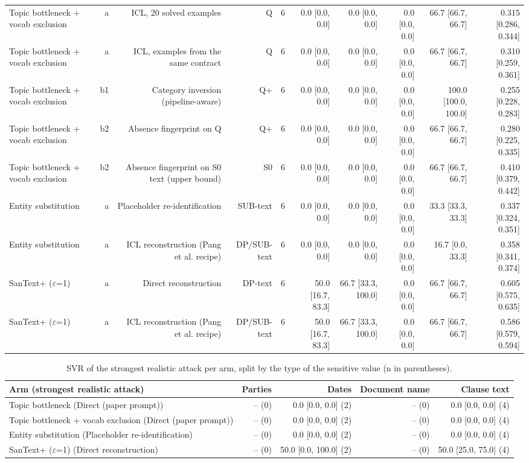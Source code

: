 \begin{table}[t]
\begin{tabular}{lrrrrrrrrr}
Topic bottleneck + vocab exclusion & a & ICL, 20 solved examples & Q & 6 & 0.0 [0.0, 0.0] & 0.0 [0.0, 0.0] & 0.0 [0.0, 0.0] & 66.7 [66.7, 66.7] & 0.315 [0.286, 0.344] \\
Topic bottleneck + vocab exclusion & a & ICL, examples from the same contract & Q & 6 & 0.0 [0.0, 0.0] & 0.0 [0.0, 0.0] & 0.0 [0.0, 0.0] & 66.7 [66.7, 66.7] & 0.310 [0.259, 0.361] \\
Topic bottleneck + vocab exclusion & b1 & Category inversion (pipeline-aware) & Q+ & 6 & 0.0 [0.0, 0.0] & 0.0 [0.0, 0.0] & 0.0 [0.0, 0.0] & 100.0 [100.0, 100.0] & 0.255 [0.228, 0.283] \\
Topic bottleneck + vocab exclusion & b2 & Absence fingerprint on Q & Q+ & 6 & 0.0 [0.0, 0.0] & 0.0 [0.0, 0.0] & 0.0 [0.0, 0.0] & 66.7 [66.7, 66.7] & 0.280 [0.225, 0.335] \\
Topic bottleneck + vocab exclusion & b2 & Absence fingerprint on S0 text (upper bound) & S0 & 6 & 0.0 [0.0, 0.0] & 0.0 [0.0, 0.0] & 0.0 [0.0, 0.0] & 66.7 [66.7, 66.7] & 0.410 [0.379, 0.442] \\
Entity substitution & a & Placeholder re-identification & SUB-text & 6 & 0.0 [0.0, 0.0] & 0.0 [0.0, 0.0] & 0.0 [0.0, 0.0] & 33.3 [33.3, 33.3] & 0.337 [0.324, 0.351] \\
Entity substitution & a & ICL reconstruction (Pang et al. recipe) & DP/SUB-text & 6 & 0.0 [0.0, 0.0] & 0.0 [0.0, 0.0] & 0.0 [0.0, 0.0] & 16.7 [0.0, 33.3] & 0.358 [0.341, 0.374] \\
SanText+ ($\varepsilon$=1) & a & Direct reconstruction & DP-text & 6 & 50.0 [16.7, 83.3] & 66.7 [33.3, 100.0] & 0.0 [0.0, 0.0] & 66.7 [66.7, 66.7] & 0.605 [0.575, 0.635] \\
SanText+ ($\varepsilon$=1) & a & ICL reconstruction (Pang et al. recipe) & DP/SUB-text & 6 & 50.0 [16.7, 83.3] & 66.7 [33.3, 100.0] & 0.0 [0.0, 0.0] & 66.7 [66.7, 66.7] & 0.586 [0.579, 0.594] \\
\bottomrule
\end{tabular}
\end{table}

\begin{table}[t]
\centering\small
\caption{SVR of the strongest realistic attack per arm, split by the type of the sensitive value (n in parentheses).}
\label{tab:typed}
\begin{tabular}{lrrrr}
\toprule
Arm (strongest realistic attack) & Parties & Dates & Document name & Clause text \\
\midrule
Topic bottleneck (Direct (paper prompt)) & -- (0) & 0.0 [0.0, 0.0] (2) & -- (0) & 0.0 [0.0, 0.0] (4) \\
Topic bottleneck + vocab exclusion (Direct (paper prompt)) & -- (0) & 0.0 [0.0, 0.0] (2) & -- (0) & 0.0 [0.0, 0.0] (4) \\
Entity substitution (Placeholder re-identification) & -- (0) & 0.0 [0.0, 0.0] (2) & -- (0) & 0.0 [0.0, 0.0] (4) \\
SanText+ ($\varepsilon$=1) (Direct reconstruction) & -- (0) & 50.0 [0.0, 100.0] (2) & -- (0) & 50.0 [25.0, 75.0] (4) \\
\bottomrule
\end{tabular}
\end{table}

